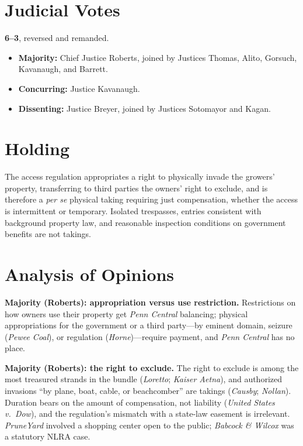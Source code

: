 \documentclass[12pt]{article}
\begin{document}
\section{Judicial Votes}

\textbf{6--3}, reversed and remanded.
\begin{itemize}
\item \textbf{Majority:} Chief Justice Roberts, joined by Justices Thomas, Alito, Gorsuch, Kavanaugh, and Barrett.
\item \textbf{Concurring:} Justice Kavanaugh.
\item \textbf{Dissenting:} Justice Breyer, joined by Justices Sotomayor and Kagan.
\end{itemize}

\section{Holding}

The access regulation appropriates a right to physically invade the growers' property, transferring to third parties the owners' right to exclude, and is therefore a \emph{per se} physical taking requiring just compensation, whether the access is intermittent or temporary. Isolated trespasses, entries consistent with background property law, and reasonable inspection conditions on government benefits are not takings.

\section{Analysis of Opinions}

\textbf{Majority (Roberts): appropriation versus use restriction.} Restrictions on how owners use their property get \textit{Penn Central} balancing; physical appropriations for the government or a third party---by eminent domain, seizure (\textit{Pewee Coal}), or regulation (\textit{Horne})---require payment, and \textit{Penn Central} has no place.

\textbf{Majority (Roberts): the right to exclude.} The right to exclude is among the most treasured strands in the bundle (\textit{Loretto}; \textit{Kaiser Aetna}), and authorized invasions ``by plane, boat, cable, or beachcomber'' are takings (\textit{Causby}; \textit{Nollan}). Duration bears on the amount of compensation, not liability (\textit{United States v.\ Dow}), and the regulation's mismatch with a state-law easement is irrelevant. \textit{PruneYard} involved a shopping center open to the public; \textit{Babcock \& Wilcox} was a statutory NLRA case.
\end{document}
